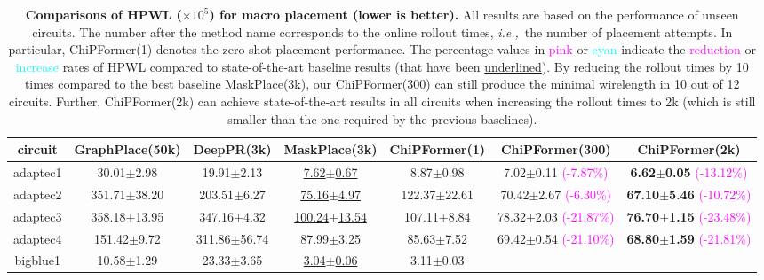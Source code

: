 \documentclass{article}
\newcommand{\ie}{\textit{i.e.,}~}
\theoremstyle{plain}
\theoremstyle{definition}
\theoremstyle{remark}
\begin{document}
\begin{table}[!htb]
\caption{
\textbf{Comparisons of HPWL ($\times$$10^5$) for macro placement (lower is better).}
All results are based on the performance of unseen circuits.
The number after the method name corresponds to the online rollout {times}, \ie the number of placement attempts. In particular, ChiPFormer(1) denotes the zero-shot placement performance. The percentage values in \textcolor{magenta}{pink} or \textcolor{cyan}{cyan} indicate the \textcolor{magenta}{reduction} or \textcolor{cyan}{increase} rates of HPWL compared to state-of-the-art baseline results (that have been \underline{underlined}). 
By reducing the rollout times by 10 times compared to the best baseline MaskPlace(3k), our ChiPFormer(300) can still produce the minimal wirelength in 10 out of 12 circuits. 
Further, ChiPFormer(2k) can achieve state-of-the-art results in all circuits when increasing the rollout times to 2k (which is still smaller than the one required by the previous baselines).
}
\label{macro-placement}
\vskip -0.2in
\begin{center}
\begin{small}
\begin{adjustbox}{max width=2.05\columnwidth}
\begin{tabular}{cccc|ccc}
\toprule circuit & GraphPlace(50k) & DeepPR(3k) &  MaskPlace(3k) & ChiPFormer(1) & ChiPFormer(300)  & ChiPFormer(2k) \\
\midrule
adaptec1   & 30.01$\pm$2.98 & 19.91$\pm$2.13 & \underline{7.62$\pm$0.67} & 8.87$\pm$0.98 & 
 7.02$\pm$0.11 \textcolor{magenta}{\scriptsize{(-7.87\%)}} & \textbf{6.62$\pm$0.05} \textcolor{magenta}{\scriptsize{(-13.12\%)}}\\
adaptec2   & 351.71$\pm$38.20 & 203.51$\pm$6.27 &  \underline{75.16$\pm$4.97} & 122.37$\pm$22.61 &
70.42$\pm$2.67 \textcolor{magenta}{\scriptsize{(-6.30\%)}} & \textbf{67.10$\pm$5.46} \textcolor{magenta}{\scriptsize{(-10.72\%)}}\\
adaptec3   & 358.18$\pm$13.95 & 347.16$\pm$4.32 &  \underline{100.24$\pm$13.54} & 107.11$\pm$8.84 & 
78.32$\pm$2.03 \textcolor{magenta}{\scriptsize{(-21.87\%)}} & \textbf{76.70$\pm$1.15} \textcolor{magenta}{\scriptsize{(-23.48\%)}}\\
adaptec4   & 151.42$\pm$9.72 & 311.86$\pm$56.74 &  \underline{87.99$\pm$3.25} & 85.63$\pm$7.52 & 
69.42$\pm$0.54 \textcolor{magenta}{\scriptsize{(-21.10\%)}} & \textbf{68.80$\pm$1.59} \textcolor{magenta}{\scriptsize{(-21.81\%)}}\\
bigblue1   & 10.58$\pm$1.29 & 23.33$\pm$3.65 & \underline{3.04$\pm$0.06} & 3.11$\pm$0.03 &

\end{tabular}
\end{adjustbox}
\end{small}
\end{center}
\end{table}
\end{document}
